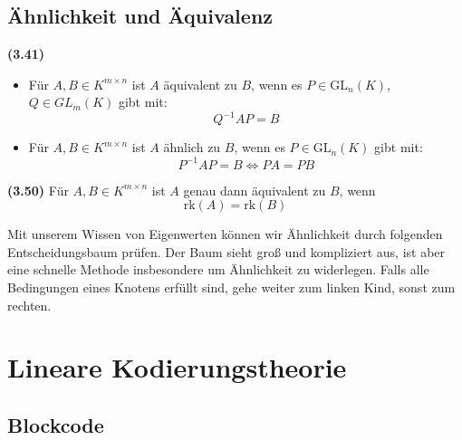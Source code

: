 \documentclass[11pt]{scrartcl}
\newlength{\hangwidth}
\newcommand{\skript}[1]{\settowidth{\hangwidth}{\textbf{(#1)} }\hangpara{\hangwidth}{1}\textbf{(#1)} }%
\newcommand{\rk}{\mathrm{rk}}%
\newcommand{\GL}{\mathrm{GL}}%
\newcommand{\geo}{\mathrm{g}}%
\newcommand{\mul}{\mathrm{m}}%
\begin{document}
\subsection{Ähnlichkeit und Äquivalenz}

\skript{3.41} \begin{itemize}
	\item Für $A, B \in K^{m \times n}$ ist $A$ äquivalent zu $B$, wenn es $P \in \GL_n(K)$, $Q \in GL_m(K)$ gibt mit: $$Q^{-1} A P = B$$
	\item Für $A, B \in K^{m \times n}$ ist $A$ ähnlich zu $B$, wenn es $P \in \GL_n(K)$ gibt mit: $$P^{-1} A P = B \iff P A = P B$$
\end{itemize}

\skript{3.50} Für $A, B \in K^{m \times n}$ ist $A$ genau dann äquivalent zu $B$, wenn $$\rk(A) = \rk(B)$$

Mit unserem Wissen von Eigenwerten können wir Ähnlichkeit durch folgenden Entscheidungsbaum prüfen. Der Baum sieht groß und kompliziert aus, ist aber eine schnelle Methode insbesondere um Ähnlichkeit zu widerlegen. Falls alle Bedingungen eines Knotens erfüllt sind, gehe weiter zum linken Kind, sonst zum rechten.


\section{Lineare Kodierungstheorie}

\subsection{Blockcode}
\end{document}
